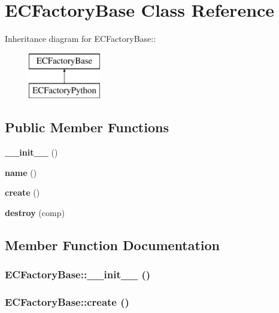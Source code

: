 \section{ECFactory\-Base Class Reference}
\label{classECFactoryBase}
Inheritance diagram for ECFactory\-Base::\begin{figure}[H]
\begin{center}
\leavevmode
\includegraphics[height=2cm]{classECFactoryBase}
\end{center}
\end{figure}
\subsection*{Public Member Functions}
\begin{CompactItemize}
\item 
{\bf \_\-\_\-init\_\-\_\-} ()
\item 
{\bf name} ()
\item 
{\bf create} ()
\item 
{\bf destroy} (comp)
\end{CompactItemize}


\subsection{Member Function Documentation}
\subsubsection{\setlength{\rightskip}{0pt plus 5cm}ECFactory\-Base::\_\-\_\-init\_\-\_\- ()}\label{classECFactoryBase_ECFactoryPythona5}


\subsubsection{\setlength{\rightskip}{0pt plus 5cm}ECFactory\-Base::create ()}\label{classECFactoryBase_ECFactoryBasea2}




